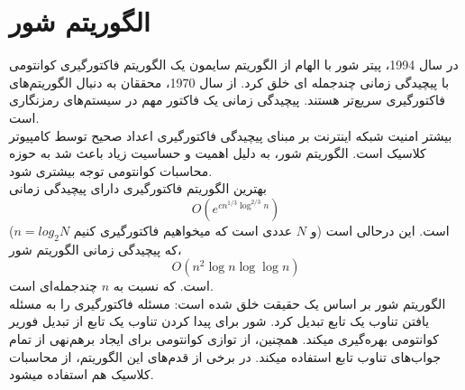 \section{الگوریتم شور}
در سال 1994، پیتر شور
با الهام از الگوریتم سایمون
یک الگوریتم فاکتورگیری کوانتومی با پیچیدگی زمانی چندجمله ای خلق کرد. از سال 1970، محققان به دنبال الگوریتم‌های فاکتورگیری سریع‌تر هستند. پیچیدگی زمانی یک فاکتور مهم در سیستم‌های رمزنگاری است.
\cite{singhbook}
\\
بیشتر امنیت شبکه اینترنت بر مبنای پیچیدگی فاکتورگیری اعداد صحیح توسط کامپیوتر کلاسیک است. الگوریتم شور، به دلیل اهمیت و حساسیت زیاد باعث شد به حوزه محاسبات کوانتومی توجه بیشتری شود.
\cite{cambridgebook}
\\
بهترین الگوریتم فاکتورگیری دارای پیچیدگی زمانی
\begin{equation}
O(e^{cn^{1/3}\log^{2/3}n})
\end{equation}
($n = log_{2}N$ و $N$ عددی است که میخواهیم فاکتورگیری کنیم)
است. این درحالی است که پیچیدگی زمانی الگوریتم شور، 
\begin{equation}
O(n^{2}\log n \log \log n)
\end{equation}
است. که نسبت به $n$ چندجمله‌ای است.
\cite{singhbook}
\\
الگوریتم شور بر اساس یک حقیقت خلق شده است: مسئله فاکتورگیری را به مسئله یافتن تناوب یک تابع تبدیل کرد. 
\cite{cambridgebook}
شور برای پیدا کردن تناوب یک تابع از تبدیل فوریر کوانتومی
بهره‌گیری میکند. همچنین، از توازی کوانتومی
برای ایجاد برهم‌نهی از تمام جواب‌های تناوب تابع استفاده میکند. در برخی از قدم‌های این الگوریتم، از محاسبات کلاسیک هم استفاده میشود.
\cite{singhbook}
